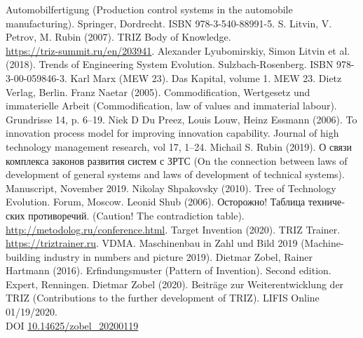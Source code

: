 \documentclass[11pt,a4paper]{article}
\begin{document}
\begin{thebibliography}{xxx}
  Automobilfertigung (Production control systems in the automobile
  manufacturing). Springer, Dordrecht. ISBN 978-3-540-88991-5.
 S. Litvin, V. Petrov, M. Rubin (2007). TRIZ Body of
  Knowledge. \\ \url{https://triz-summit.ru/en/203941}.
 Alexander Lyubomirskiy, Simon Litvin et al. (2018). Trends
  of Engineering System Evolution. Sulzbach-Rosenberg. ISBN 978-3-00-059846-3.
 Karl Marx (MEW 23). Das Kapital, volume 1. MEW 23. Dietz
  Verlag, Berlin.
 Franz Naetar (2005). Commodification, Wertgesetz und
  immaterielle Arbeit (Commodification, law of values and immaterial labour).
  Grundrisse 14, p. 6--19.
 Niek D Du Preez, Louis Louw, Heinz Essmann (2006). To
  innovation process model for improving innovation capability. Journal of
  high technology management research, vol 17, 1--24.
 Michail S. Rubin (2019).  \foreignlanguage{russian}{О
  связи комплекса законов развития систем с ЗРТС} (On the connection between
  laws of development of general systems and laws of development of technical
  systems). Manuscript, November 2019.
 Nikolay Shpakovsky (2010). Tree of Technology
  Evolution. Forum, Moscow.
 Leonid Shub (2006). \foreignlanguage{russian}{Осторожно!
  Таблица технических противоречий}. (Caution! The contradiction table).
  \url{http://metodolog.ru/conference.html}. 
 Target Invention (2020). TRIZ Trainer.
  \url{https://triztrainer.ru}.
 VDMA. Maschinenbau in Zahl und Bild 2019 (Machine-building
  industry in numbers and picture 2019).
 Dietmar Zobel, Rainer Hartmann (2016). Erfindungsmuster
  (Pattern of Invention).  Second edition. Expert, Renningen.
 Dietmar Zobel (2020). Beiträge zur Weiterentwicklung der
  TRIZ (Contributions to the further development of TRIZ).  LIFIS Online
  01/19/2020.\\ DOI \url{10.14625/zobel_20200119}
\end{thebibliography}
\end{document}
